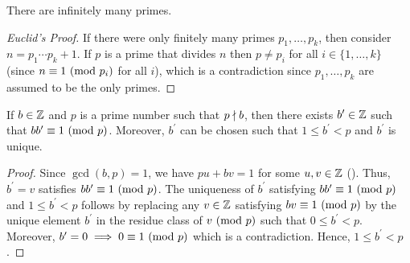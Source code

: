 \begin{prop} \label{prop:infinite_primes}
    There are infinitely many primes.
\end{prop}
\begin{proof}[Euclid's Proof]
    If there were only finitely many primes $p_1, \ldots, p_k$, then consider $n = p_1 \cdots p_k + 1$. If $p$ is a prime that divides $n$ then $p \neq p_i$ for all $i \in \{1, \ldots, k\}$ (since $n \equiv 1\ (\mathrm{mod}\ p_i)$ for all $i$), which is a contradiction since $p_1, \ldots, p_k$ are assumed to be the only primes.
\end{proof}

\begin{prop} \label{prop:mult-inverse-mod-p}
    If $b \in \mathbb{Z}$ and $p$ is a prime number such that $p \nmid b$, then there exists $b^{\prime} \in \mathbb{Z}$ such that $bb^{\prime} \equiv 1 \ (\mathrm{mod}\ p)$. Moreover, $b^{\prime}$ can be chosen such that $1 \leq b^{\prime} < p$ and $b^{\prime}$ is unique.
\end{prop}
\begin{proof}
    Since $\gcd(b,p) = 1$, we have $pu + bv = 1$ for some $u,v \in \mathbb{Z}$ (). Thus, $b^{\prime} = v$ satisfies $bb^{\prime} \equiv 1 \ (\mathrm{mod}\ p)$. The uniqueness of $b^{\prime}$ satisfying $bb^{\prime} \equiv 1 \ (\mathrm{mod}\ p)$ and $1 \leq b^{\prime} < p$ follows by replacing any $v \in \mathbb{Z}$ satisfying $bv \equiv 1 \ (\mathrm{mod}\ p)$ by the unique element $b^{\prime}$ in the residue class of $v \ (\mathrm{mod}\ p)$ such that $0 \leq b^{\prime} < p$. Moreover, $b^{\prime} = 0 \implies 0 \equiv 1 \ (\mathrm{mod}\ p)$ which is a contradiction. Hence, $1 \leq b^{\prime} < p$.
\end{proof}

